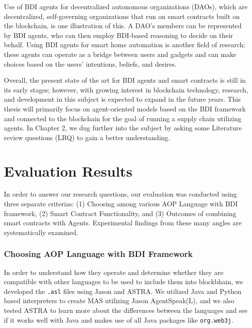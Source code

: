 \vspace{.5cm}
Use of \ac{BDI} agents for decentralized autonomous organizations (DAOs), which are decentralized, self-governing organizations that run on smart contracts built on the blockchain, is one illustration of this. A DAO's members can be represented by \ac{BDI} agents, who can then employ \ac{BDI}-based reasoning to decide on their behalf. Using \ac{BDI} agents for smart home automation is another field of research; these agents can operate as a bridge between users and gadgets and can make choices based on the users' intentions, beliefs, and desires.

\vspace{.5cm}

Overall, the present state of the art for \ac{BDI} agents and smart contracts is still in its early stages; however, with growing interest in blockchain technology, research, and development in this subject is expected to expand in the future years. This thesis will primarily focus on agent-oriented models based on the \ac{BDI} framework and connected to the blockchain for the goal of running a supply chain utilizing agents. In Chapter 2, we dug further into the subject by asking some Literature review questions (LRQ) to gain a better understanding.

\section{Evaluation Results}

In order to answer our research questions, our evaluation was conducted using three separate criterias: (1) Choosing among various \ac{AOP} Language with \ac{BDI} framework, (2) Smart Contract Functionality, and (3) Outcomes of combining smart contracts with Agents. Experimental findings from these many angles are systematically examined.

\subsubsection{Choosing \ac{AOP} Language with \ac{BDI} Framework}

  In order to understand how they operate and determine whether they are compatible with other languages to be used to include them into blockbhain, we developed the \texttt{.asl} files using Jason and ASTRA. We utilized Java and Python based interpreters to create \ac{MAS} utilizing Jason AgentSpeak(L), and we also tested ASTRA to learn more about the differences between the languages and see if it works well with Java and makes use of all Java packages like \texttt{org.web3j}. 

